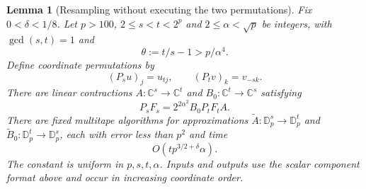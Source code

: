 \documentclass[11pt]{article}
\newtheorem{lemma}[theorem]{Lemma}
\theoremstyle{definition}
\begin{document}
\begin{lemma}[Resampling without executing the two permutations]
\label{lem:no-sort-resampling}
Fix $0<\delta<1/8$. Let $p>100$, $2\leq s<t<2^p$ and $2\leq\alpha<\sqrt p$
be integers, with $\gcd(s,t)=1$ and
\[
 \theta:=t/s-1>p/\alpha^4.
\]
Define coordinate permutations by
\[
 (P_su)_j=u_{tj},\qquad (P_tv)_k=v_{-sk}.
\]
There are linear contractions $A:\mathbb C^s\to\mathbb C^t$ and
$B_0:\mathbb C^t\to\mathbb C^s$ satisfying
\begin{equation}
 P_sF_s=2^{2\alpha^2}B_0P_tF_tA.
 \label{eq:no-sort-one-dimensional}
\end{equation}
There are fixed multitape algorithms for approximations
$\widetilde A:\mathbb D_p^s\to\mathbb D_p^t$ and
$\widetilde B_0:\mathbb D_p^t\to\mathbb D_p^s$, each with error less
than $p^2$ and time
\[
 O(tp^{3/2+\delta}\alpha).
\]
The constant is uniform in $p,s,t,\alpha$. Inputs and outputs use the
scalar component format above and occur in increasing coordinate order.
\end{lemma}
\end{document}
